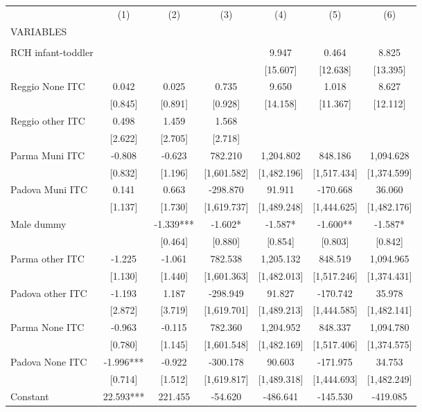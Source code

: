 \begin{tabular}{lcccccc} \hline
 & (1) & (2) & (3) & (4) & (5) & (6) \\
VARIABLES &  &  &  &  &  &  \\ \hline
 &  &  &  &  &  &  \\
RCH infant-toddler &  &  &  & 9.947 & 0.464 & 8.825 \\
 &  &  &  & [15.607] & [12.638] & [13.395] \\
Reggio None ITC & 0.042 & 0.025 & 0.735 & 9.650 & 1.018 & 8.627 \\
 & [0.845] & [0.891] & [0.928] & [14.158] & [11.367] & [12.112] \\
Reggio other ITC & 0.498 & 1.459 & 1.568 &  &  &  \\
 & [2.622] & [2.705] & [2.718] &  &  &  \\
Parma Muni ITC & -0.808 & -0.623 & 782.210 & 1,204.802 & 848.186 & 1,094.628 \\
 & [0.832] & [1.196] & [1,601.582] & [1,482.196] & [1,517.434] & [1,374.599] \\
Padova Muni ITC & 0.141 & 0.663 & -298.870 & 91.911 & -170.668 & 36.060 \\
 & [1.137] & [1.730] & [1,619.737] & [1,489.248] & [1,444.625] & [1,482.176] \\
Male dummy &  & -1.339*** & -1.602* & -1.587* & -1.600** & -1.587* \\
 &  & [0.464] & [0.880] & [0.854] & [0.803] & [0.842] \\
Parma other ITC & -1.225 & -1.061 & 782.538 & 1,205.132 & 848.519 & 1,094.965 \\
 & [1.130] & [1.440] & [1,601.363] & [1,482.013] & [1,517.246] & [1,374.431] \\
Padova other ITC & -1.193 & 1.187 & -298.949 & 91.827 & -170.742 & 35.978 \\
 & [2.872] & [3.719] & [1,619.701] & [1,489.213] & [1,444.585] & [1,482.141] \\
Parma None ITC & -0.963 & -0.115 & 782.360 & 1,204.952 & 848.337 & 1,094.780 \\
 & [0.780] & [1.145] & [1,601.548] & [1,482.169] & [1,517.406] & [1,374.575] \\
Padova None ITC & -1.996*** & -0.922 & -300.178 & 90.603 & -171.975 & 34.753 \\
 & [0.714] & [1.512] & [1,619.817] & [1,489.318] & [1,444.693] & [1,482.249] \\
Constant & 22.593*** & 221.455 & -54.620 & -486.641 & -145.530 & -419.085 \\

\end{tabular}
